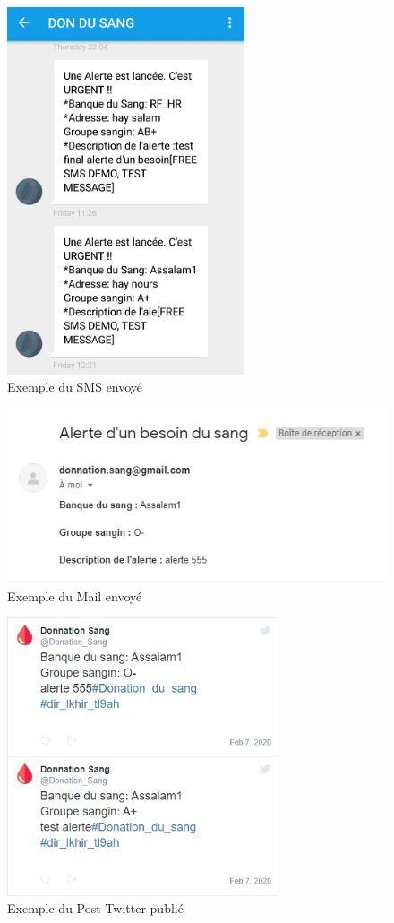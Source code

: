 \documentclass[12pt,a4paper,twoside]{report}
\begin{document}
{{\begin{itemize}
								\begin{figure}[H]
									 \includegraphics[width=7cm]{Images/sms.jpg}
									 \centering
									 \caption{\label{sms} Exemple du SMS envoyé}
								\end{figure}
								
								\begin{figure}[H]
									 \includegraphics[width=13cm]{Images/mail.png}
									 \centering
									 \caption{\label{mail} Exemple du Mail envoyé}
								\end{figure}
								
								\begin{figure}[H]
									 \includegraphics[width=8cm]{Images/twitter.png}
									 \centering
									 \caption{\label{twitter} Exemple du Post Twitter publié}
								\end{figure}
					

\end{itemize}}}
\end{document}
